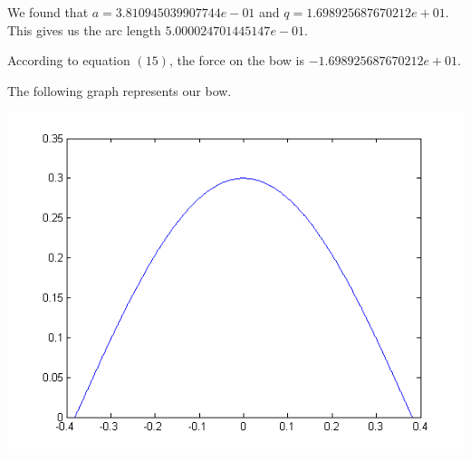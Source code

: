 We found that $a=3.810945039907744e-01$ and $q=1.698925687670212e+01$. This gives us the arc length $5.000024701445147e-01$.

According to equation $(15)$, the force on the bow is $-1.698925687670212e+01$.

The following graph represents our bow.

\includegraphics[width=\textwidth]{bow.png}
